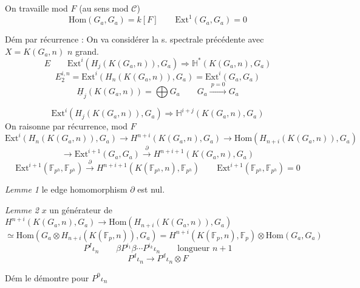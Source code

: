 \documentclass[11pt,a4paper]{article}
\begin{document}
On travaille mod $F$ (au sens mod $\mathcal{C}$)
\[
  \mathrm{Hom}(G_a,G_a) = k[F] \qquad \mathrm{Ext}^1(G_a,G_a) = 0
\]

Dém par récurrence : On va considérer la s. spectrale précédente avec $X = K(G_a,n)$ \qquad {} \quad $n$ grand.
\[
  E \qquad \mathrm{Ext}^i(H_j(K(G_a,n)),G_a) \Longrightarrow \mathbb{H}^{\ast}(K(G_a,n),G_a)
\]
\[
  E_2^{i,n} = \mathrm{Ext}^i(H_n(K(G_a,n)),G_a) = \mathrm{Ext}^i(G_a,G_a)
\]
\[
  \underline{H}_j(K(G_a,n)) = \bigoplus G_a \qquad G_a \xrightarrow{\ p=0\ } G_a
\]


\[
  \mathrm{Ext}^i(H_j(K(G_a,n)),G_a) \Longrightarrow \mathbb{H}^{i+j}(K(G_a,n),G_a)
\]
On raisonne par récurrence, mod $F$
\[
  \mathrm{Ext}^i(H_n(K(G_a,n)),G_a) \to H^{n+i}(K(G_a,n),G_a)
  \to \mathrm{Hom}(H_{n+i}(K(G_a,n)),G_a)
\]
\[
  \to \mathrm{Ext}^{i+1}(G_a,G_a) \xrightarrow{\ \partial\ } H^{n+i+1}(K(G_a,n),G_a)
\]
\[
  \mathrm{Ext}^{i+1}(\mathbb{F}_{p^h},\mathbb{F}_{p^h}) \xrightarrow{\ \partial\ }
  H^{n+i+1}(K(\mathbb{F}_{p^h},n),\mathbb{F}_{p^h})
  \qquad \mathrm{Ext}^{i+1}(\mathbb{F}_{p^h},\mathbb{F}_{p^h}) = 0
\]

\emph{Lemme 1} \quad le edge homomorphism $\partial$ est nul.

\emph{Lemme 2} \quad $x$ un générateur de $H^{n+i}(K(G_a,n),G_a) \to \mathrm{Hom}(H_{n+i}(K(G_a,n)),G_a)$
\[
  \simeq \mathrm{Hom}(G_a\otimes H_{n+i}(K(\mathbb{F}_p,n)),G_a)
  = H^{n+i}(K(\mathbb{F}_p,n),\mathbb{F}_p)\otimes\mathrm{Hom}(G_a,G_a)
\]
\[
  P^I\iota_n \qquad \beta P^{i_1}\beta\cdots P^{i_k}\iota_n \qquad \text{longueur } n+1
\]
\[
  P^d\iota_n \longrightarrow P^d\iota_n\otimes F
\]

Dém \quad {} le démontre pour $P^0\iota_n$
\end{document}
